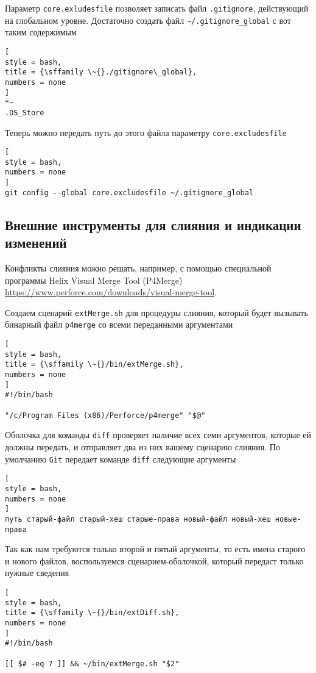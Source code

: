 \documentclass[%
	11pt,
	a4paper,
	utf8,
		]{article}
\begin{document}
Параметр \texttt{core.exludesfile} позволяет записать файл \texttt{.gitignore}, действующий на глобальном уровне. Достаточно создать файл \verb|~/.gitignore_global| с вот таким содержимым
\begin{lstlisting}[
style = bash,
title = {\sffamily \~{}./gitignore\_global},
numbers = none
]
*~
.DS_Store
\end{lstlisting}

Теперь можно передать путь до этого файла параметру \texttt{core.excludesfile}
\begin{lstlisting}[
style = bash,
numbers = none
]
git config --global core.excludesfile ~/.gitignore_global
\end{lstlisting}

\subsection{Внешние инструменты для слияния и индикации изменений}

Конфликты слияния можно решать, например, с помощью специальной программы Helix Visual Merge Tool (P4Merge) \url{https://www.perforce.com/downloads/visual-merge-tool}.

Создаем сценарий \texttt{extMerge.sh} для процедуры слияния, который будет вызывать бинарный файл \texttt{p4merge} со всеми переданными аргументами
\begin{lstlisting}[
style = bash,
title = {\sffamily \~{}/bin/extMerge.sh},
numbers = none
]
#!/bin/bash

"/c/Program Files (x86)/Perforce/p4merge" "$@"
\end{lstlisting}

Оболочка для команды \texttt{diff} проверяет наличие всех семи аргументов, которые ей должны передать, и отправляет два из них вашему сценарию слияния. По умолчанию \texttt{Git} передает команде \texttt{diff} следующие аргументы
\begin{lstlisting}[
style = bash,
numbers = none
]
путь старый-файл старый-хеш старые-права новый-файл новый-хеш новые-права
\end{lstlisting}

Так как нам требуются только второй и пятый аргументы, то есть имена старого и нового файлов, воспользуемся сценарием-оболочкой, который передаст только нужные сведения
\begin{lstlisting}[
style = bash,
title = {\sffamily \~{}/bin/extDiff.sh},
numbers = none
]
#!/bin/bash

[[ $# -eq 7 ]] && ~/bin/extMerge.sh "$2" 
\end{lstlisting}
\end{document}
